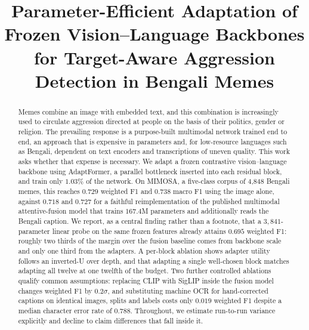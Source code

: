 \documentclass[conference]{IEEEtran}
\begin{document}

\title{Parameter-Efficient Adaptation of Frozen Vision--Language Backbones for
Target-Aware Aggression Detection in Bengali Memes}

\author{
\and
{}
}

\maketitle

\begin{abstract}
Memes combine an image with embedded text, and this combination is increasingly
used to circulate aggression directed at people on the basis of their politics,
gender or religion. The prevailing response is a purpose-built multimodal
network trained end to end, an approach that is expensive in parameters and, for
low-resource languages such as Bengali, dependent on text encoders and
transcriptions of uneven quality. This work asks whether that expense is
necessary. We adapt a frozen contrastive vision--language backbone using
AdaptFormer, a parallel bottleneck inserted into each residual block, and train
only $1.03\%$ of the network. On MIMOSA, a five-class corpus of 4{,}848 Bengali
memes, this reaches $0.729$ weighted F1 and $0.738$ macro F1 using the image
alone, against $0.718$ and $0.727$ for a faithful reimplementation of the
published multimodal attentive-fusion model that trains $167.4$M parameters and
additionally reads the Bengali caption. We report, as a central finding rather
than a footnote, that a $3{,}841$-parameter linear probe on the same frozen
features already attains $0.695$ weighted F1: roughly two thirds of the margin
over the fusion baseline comes from backbone scale and only one third from the
adapters. A per-block ablation shows adapter utility follows an inverted-U over
depth, and that adapting a single well-chosen block matches adapting all twelve
at one twelfth of the budget. Two further controlled ablations qualify common
assumptions: replacing CLIP with SigLIP inside the fusion model changes weighted
F1 by $0.2\sigma$, and substituting machine OCR for hand-corrected captions on
identical images, splits and labels costs only $0.019$ weighted F1 despite a
median character error rate of $0.788$. Throughout, we estimate run-to-run
variance explicitly and decline to claim differences that fall inside it.
\end{abstract}
\end{document}
